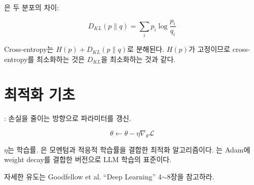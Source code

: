 은 두 분포의 차이:

\[
D_{KL}(p \| q) = \sum_i p_i \log \frac{p_i}{q_i}
\]

Cross-entropy는 $H(p) + D_{KL}(p \| q)$로 분해된다. $H(p)$가 고정이므로 cross-entropy를 최소화하는 것은 $D_{KL}$을 최소화하는 것과 같다.

\section{최적화 기초}

: 손실을 줄이는 방향으로 파라미터를 갱신.

\[
\theta \leftarrow \theta - \eta \nabla_\theta \mathcal{L}
\]

$\eta$는 학습률. 은 모멘텀과 적응적 학습률을 결합한 최적화 알고리즘이다. 는 Adam에 weight decay를 결합한 버전으로 LLM 학습의 표준이다.

자세한 유도는 Goodfellow et al. ``Deep Learning'' 4$\sim$8장을 참고하라.
